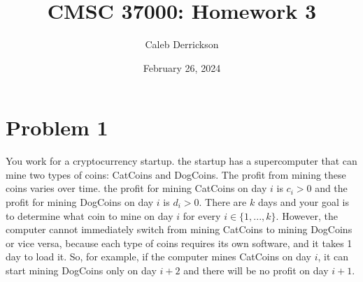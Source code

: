 

\title{CMSC 37000: Homework 3}
\author{Caleb Derrickson}
\date{February 26, 2024}


\onehalfspacing
\maketitle
\allowdisplaybreaks

\tableofcontents

\newpage
\section{Problem 1}
You work for a cryptocurrency startup. the startup has a supercomputer that can mine two types of coins: CatCoins and DogCoins. The profit from mining these coins varies over time. the profit for mining CatCoins on day $i$ is $c_i > 0$ and the profit for mining DogCoins on day $i$ is $d_i > 0$. There are $k$ days and your goal is to determine what coin to mine on day $i$ for every $i \in \{1, ..., k\}$. However, the computer cannot immediately switch from mining CatCoins to mining DogCoins or vice versa, because each type of coins requires its own software, and it takes 1 day to load it. So, for example, if the computer mines CatCoins on day $i$, it can start mining DogCoins only on day $i+2$ and there will be no profit on day $i+1$. \par

